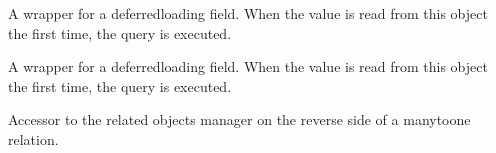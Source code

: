 \documentclass[letterpaper,10pt,english]{sphinxmanual}
\begin{document}
\begin{fulllineitems}
\begin{fulllineitems}
\end{fulllineitems}


\begin{fulllineitems}
\label{\detokenize{pages_app.models:id36}}
\pysigstartsignatures
\pysigline
{}
\pysigstopsignatures
\sphinxAtStartPar
A wrapper for a deferred\sphinxhyphen{}loading field. When the value is read from this
object the first time, the query is executed.

\end{fulllineitems}


\begin{fulllineitems}
\label{\detokenize{pages_app.models:id37}}
\pysigstartsignatures
\pysigline
{}
\pysigstopsignatures
\sphinxAtStartPar
A wrapper for a deferred\sphinxhyphen{}loading field. When the value is read from this
object the first time, the query is executed.

\end{fulllineitems}


\begin{fulllineitems}
\label{\detokenize{pages_app.models:pages_app.models.Page.objects}}
\pysigstartsignatures
\pysigline
{}
\pysigstopsignatures
\end{fulllineitems}


\begin{fulllineitems}
\label{\detokenize{pages_app.models:pages_app.models.Page.pageblock_set}}
\pysigstartsignatures
\pysigline
{}
\pysigstopsignatures
\sphinxAtStartPar
Accessor to the related objects manager on the reverse side of a
many\sphinxhyphen{}to\sphinxhyphen{}one relation.


\end{fulllineitems}
\end{fulllineitems}
\end{document}
